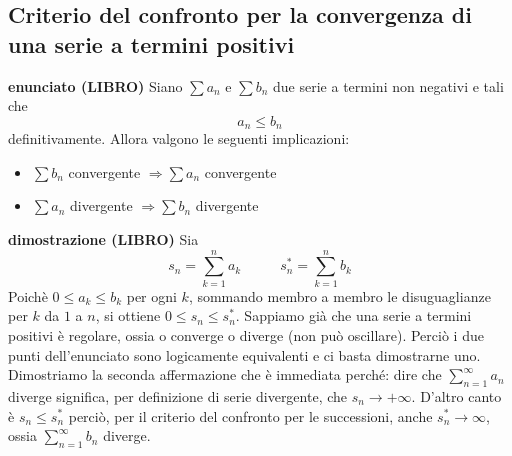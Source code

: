 \documentclass[a4paper, 9pt]{report}
\begin{document}
\newpage
\subsection*{Criterio del confronto per la convergenza di una serie a termini positivi}
\textbf{enunciato (LIBRO)}\newline
Siano $\sum a_n$ e $\sum b_n$ due serie a termini non negativi e tali che
\[
    a_n\leq b_n
\]
definitivamente.\newline
Allora valgono le seguenti implicazioni:
\begin{itemize}
    \item $\sum b_n$ convergente $\Rightarrow \sum a_n$ convergente
    \item $\sum a_n$ divergente $\Rightarrow  \sum b_n$ divergente
\end{itemize}
\textbf{dimostrazione (LIBRO)}\newline
Sia
\[
    s_n = \sum_{k=1}^{n}a_k \;\;\;\;\;\;\;\;\;\;s_n^* = \sum_{k=1}^{n}b_k
\]
Poichè $0 \leq a_k \leq b_k$ per ogni $k$, sommando membro a membro le disuguaglianze per $k$ da $1$ a $n$, si ottiene $0\leq s_n\leq s_n^*$. Sappiamo già che una serie a termini positivi è regolare, ossia o converge o diverge (non può oscillare). Perciò i due punti dell'enunciato sono logicamente equivalenti e ci basta dimostrarne uno. Dimostriamo la seconda affermazione che è immediata perché: dire che $\sum_{n=1}^{\infty} a_n$ diverge significa, per definizione di serie divergente, che $s_n \rightarrow +\infty$.\newline
D'altro canto è $s_n \leq s_n^*$ perciò, per il criterio del confronto per le successioni, anche $s_n^* \rightarrow  \infty$, ossia $\sum_{n=1}^{\infty}b_n$ diverge.







\newpage
\end{document}
